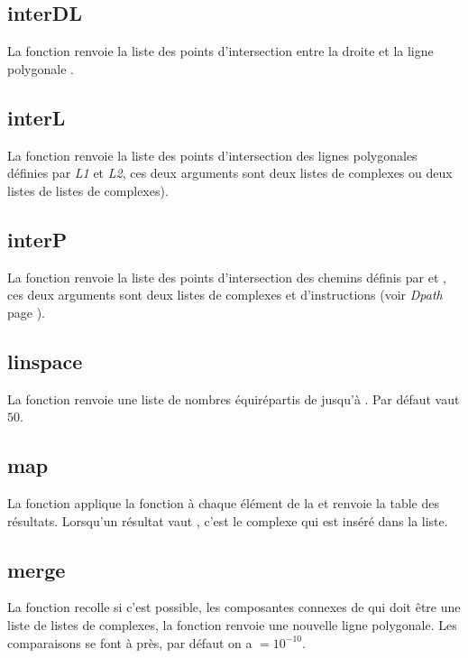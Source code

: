\subsection{interDL}
La fonction  renvoie la liste des points d'intersection entre la droite  et la ligne polygonale .

\subsection{interL}
La fonction  renvoie la liste des points d'intersection des lignes polygonales définies par \emph{L1} et \emph{L2}, ces deux arguments sont deux listes de complexes ou deux listes de listes de complexes).

\subsection{interP}
La fonction  renvoie la liste des points d'intersection des chemins définis par  et , ces deux arguments sont deux listes de complexes et d'instructions (voir \emph{Dpath} page \pageref{Dpath}).


\subsection{linspace}
La fonction  renvoie une liste de  nombres équirépartis de  jusqu'à . Par défaut  vaut $50$.

\subsection{map}
La fonction  applique la fonction  à chaque élément de la  et renvoie la table des résultats. Lorsqu'un résultat vaut \nil, c'est le complexe  qui est inséré dans la liste.

\subsection{merge}
La fonction  recolle si c'est possible, les composantes connexes de  qui doit être une liste de listes de complexes, la fonction renvoie une nouvelle ligne polygonale. Les comparaisons se font à  près, par défaut on a $=10^{-10}$.

